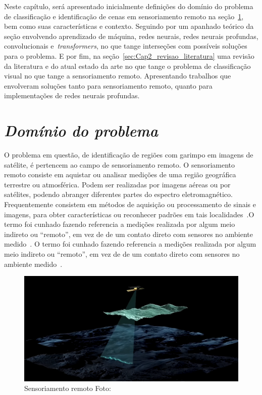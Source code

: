 Neste capítulo, será apresentado inicialmente definições do domínio do problema de classificação e identificação de cenas em sensoriamento remoto na seção~\ref{sec:Cap2_dominio}, bem como suas características e contexto. Seguindo por um apanhado teórico da seção envolvendo aprendizado de máquina, redes neurais, redes neurais profundas, convolucionais e~\textit{transformers}, no que tange interseções com possíveis soluções para o problema.
E por fim, na seção~\ref{sec:Cap2_revisao_literatura} uma revisão da literatura e do atual estado da arte no que tange o problema de classificação visual no que tange a sensoriamento remoto. Apresentando trabalhos que envolveram soluções tanto para sensoriamento remoto, quanto para implementações de redes neurais profundas.



\section{\textit{Domínio do problema}}\label{sec:Cap2_dominio}


O problema em questão, de identificação de regiões com garimpo em imagens de satélite, é pertencem ao campo de sensoriamento remoto. O sensoriamento remoto consiste em aquistar ou analisar medições de uma região geográfica terrestre ou atmosférica. Podem ser realizadas por imagens aéreas ou por satélites, podendo abranger diferentes partes do espectro eletromagnético.
Frequentemente consistem em métodos de aquisição ou processamento de sinais e imagens, para obter características ou reconhecer padrões em tais localidades~\cite{emery2017introduction}.O termo foi cunhado fazendo referencia a medições realizada por algum meio indireto ou “remoto”, em vez de de um contato direto com sensores no ambiente medido~\cite{emery2017introduction}. O termo foi cunhado fazendo referencia a medições realizada por algum meio indireto ou “remoto”, em vez de de um contato direto com sensores no ambiente medido~\cite{emery2017introduction}.

\begin{figure}[h!]
    \centering
    \includegraphics[width=0.9\columnwidth]{Imagens/foto_satelite.png}
    \caption{Sensoriamento remoto Foto:}
    \label{fig:sensoriamento}
\end{figure}

